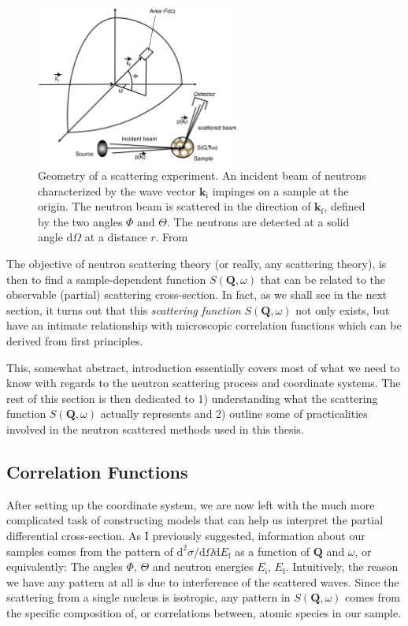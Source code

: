 \begin{figure}
	\centering
	\includegraphics[width=0.6\textwidth]{fig/method/ns/dsdo_schober.png}
	\caption[scattering cross-section geometry]{Geometry of a scattering experiment. An incident beam of neutrons characterized by the wave vector $\bm{k}_\text{i}$ impinges on a sample at the origin. The neutron beam is scattered in the direction of $\bm{k}_\text{f}$, defined by the two angles $\Phi$ and $\Theta$. The neutrons are detected at a solid angle $\mathrm{d}\Omega$ at a distance $r$. From \cite{Schober2014}}
	\label{fig:dsdo_geometry}
\end{figure}

The objective of neutron scattering theory (or really, any scattering theory), is then to find a sample-dependent function $S(\bm{Q}, \omega)$ that can be related to the observable (partial) scattering cross-section. In fact, as we shall see in the next section, it turns out that this \emph{scattering function} $S(\bm{Q}, \omega)$ not only exists, but have an intimate relationship with microscopic correlation functions which can be derived from first principles. 

This, somewhat abstract, introduction essentially covers most of what we need to know with regards to the neutron scattering process and coordinate systems. The rest of this section is then dedicated to 1) understanding what the scattering function $S(\bm{Q}, \omega)$ actually represents and 2) outline some of practicalities involved in the neutron scattered methods used in this thesis. 

\subsection{Correlation Functions}
After setting up the coordinate system, we are now left with the much more complicated task of constructing models that can help us interpret the partial differential cross-section. As I previously suggested, information about our samples comes from the pattern of $\mathrm{d}^2 \sigma / \mathrm{d}\Omega \mathrm{d}E_\text{f}$ as a function of $\bm{Q}$ and $\omega$, or equivalently: The angles $\Phi$, $\Theta$ and neutron energies $E_\text{i}$, $E_\text{f}$. Intuitively, the reason we have any pattern  at all is due to interference of the scattered waves. Since the scattering from a single nucleus is isotropic, any pattern in $S(\bm{Q}, \omega)$ comes from the specific composition of, or correlations between, atomic species in our sample. 


